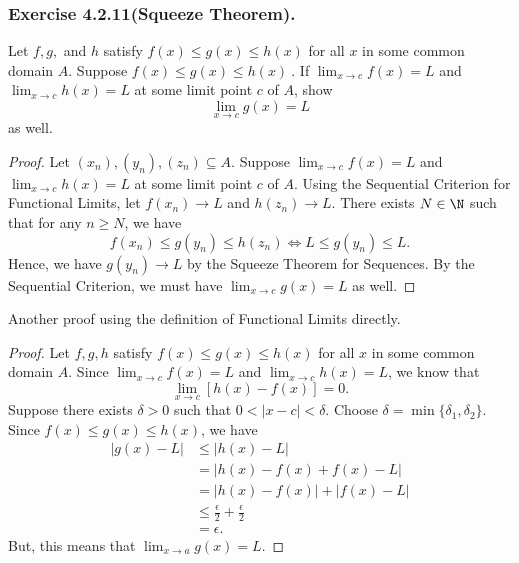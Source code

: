 \subsubsection{Exercise 4.2.11(Squeeze Theorem).} Let \( f,g, \) and \( h \) satisfy \( f(x) \leq g(x) \leq h(x) \) for all \( x  \) in some common domain \( A  \). Suppose \( f(x) \leq g(x) \leq h(x) \ \). If \( \lim_{ x \to c  } f(x) = L  \) and \( \lim_{ x \to c } h(x) = L  \) at some limit point \( c \) of \( A  \), show 
\[  \lim_{ x \to c } g(x) = L  \] as well.
\begin{proof}
Let \( (x_n), (y_n), (z_n) \subseteq A   \). Suppose \( \lim_{ x \to c } f(x) = L  \) and \( \lim_{ x \to c } h(x) = L  \) at some limit point \( c \) of \( A  \). Using the Sequential Criterion for Functional Limits, let \( f(x_n) \to L  \) and \( h(z_n) \to L  \). There exists \( N \in \N  \) such that for any \( n \geq N  \), we have 
\[ f(x_n) \leq g(y_n) \leq h(z_n) \iff L \leq g(y_n) \leq L. \]
Hence, we have \( g(y_n) \to L  \) by the Squeeze Theorem for Sequences. By the Sequential Criterion, we must have \( \lim_{ x \to c } g(x) = L  \) as well.
\end{proof}

Another proof using the definition of Functional Limits directly.

\begin{proof}
Let \( f, g, h \) satisfy \( f(x) \leq g(x) \leq h(x) \) for all \( x  \) in some common domain \( A  \). Since \( \lim_{ x \to c } f(x) = L  \) and \( \lim_{ x \to c } h(x) = L  \), we know that 
\[ \lim_{ x \to c } [h(x) - f(x)] = 0.  \]
Suppose there exists \( \delta > 0  \) such that \(  0 < | x - c  | < \delta  \). Choose \( \delta = \min \{ \delta_1, \delta_2  \}  \). Since \( f(x) \leq g(x) \leq h(x) \), we have 
\begin{align*}
    | g(x) - L  | &\leq | h(x) - L  |  \\
                  &= | h(x) - f(x) + f(x) - L  | \\
                  &= | h(x) - f(x)  | + |  f(x) - L  | \\
                  &\leq \frac{ \epsilon  }{ 2 } + \frac{ \epsilon  }{ 2 } \\
                  &= \epsilon.
\end{align*}
But, this means that \( \lim_{ x \to a } g(x) = L.  \)
\end{proof}









